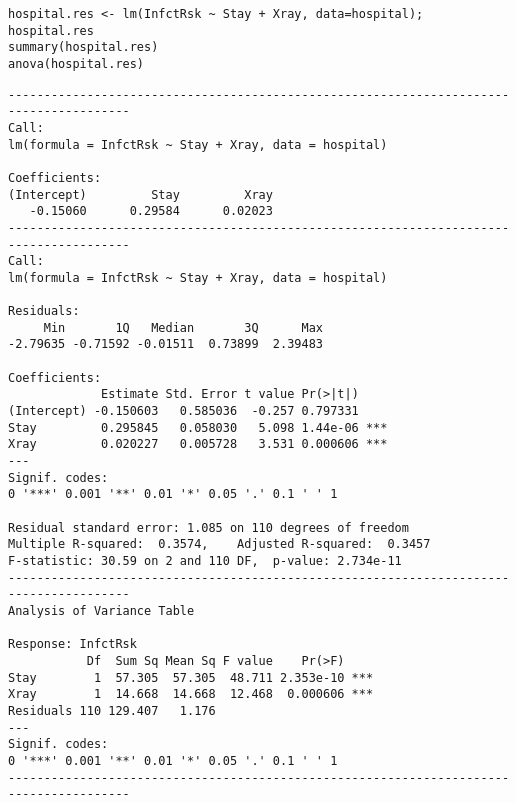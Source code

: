 \documentclass{article}
\begin{document}
\begin{lstlisting}[style={r-style}]
hospital.res <- lm(InfctRsk ~ Stay + Xray, data=hospital); hospital.res
summary(hospital.res)
anova(hospital.res)
\end{lstlisting}
\begin{lstlisting}[style={out-style}]
---------------------------------------------------------------------------------------
Call:
lm(formula = InfctRsk ~ Stay + Xray, data = hospital)

Coefficients:
(Intercept)         Stay         Xray  
   -0.15060      0.29584      0.02023
---------------------------------------------------------------------------------------
Call:
lm(formula = InfctRsk ~ Stay + Xray, data = hospital)

Residuals:
     Min       1Q   Median       3Q      Max 
-2.79635 -0.71592 -0.01511  0.73899  2.39483 

Coefficients:
             Estimate Std. Error t value Pr(>|t|)    
(Intercept) -0.150603   0.585036  -0.257 0.797331    
Stay         0.295845   0.058030   5.098 1.44e-06 ***
Xray         0.020227   0.005728   3.531 0.000606 ***
---
Signif. codes:  
0 '***' 0.001 '**' 0.01 '*' 0.05 '.' 0.1 ' ' 1

Residual standard error: 1.085 on 110 degrees of freedom
Multiple R-squared:  0.3574,	Adjusted R-squared:  0.3457 
F-statistic: 30.59 on 2 and 110 DF,  p-value: 2.734e-11
---------------------------------------------------------------------------------------
Analysis of Variance Table

Response: InfctRsk
           Df  Sum Sq Mean Sq F value    Pr(>F)    
Stay        1  57.305  57.305  48.711 2.353e-10 ***
Xray        1  14.668  14.668  12.468  0.000606 ***
Residuals 110 129.407   1.176                      
---
Signif. codes:  
0 '***' 0.001 '**' 0.01 '*' 0.05 '.' 0.1 ' ' 1
---------------------------------------------------------------------------------------
\end{lstlisting}              
\end{document}
